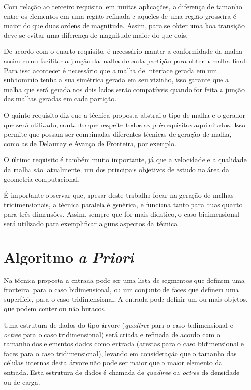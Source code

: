 Com relação ao terceiro requisito, em muitas aplicações, a diferença de tamanho entre os elementos em uma região refinada e aqueles de uma região grosseira é maior do que duas ordens de magnitude. Assim, para se obter uma boa transição deve-se evitar uma diferença de magnitude maior do que dois.

De acordo com o quarto requisito, é necessário manter a conformidade da malha assim como facilitar a junção da malha de cada partição para obter a malha final. Para isso acontecer é necessário que a malha de interface gerada em um subdomínio tenha a sua simétrica gerada em seu vizinho, isso garante que a malha que será gerada nos dois lados serão compatíveis quando for feita a junção das malhas geradas em cada partição.

O quinto requisito diz que a técnica proposta abstrai o tipo de malha e o gerador que será utilizado, contanto que respeite todos os pré-requisitos aqui citados. Isso permite que possam ser combinadas diferentes técnicas de geração de malha, como as de Delaunay e Avanço de Fronteira, por exemplo.

O último requisito é também muito importante, já que a velocidade e a qualidade da malha são, atualmente, um dos principais objetivos de estudo na área da geometria computacional.

É importante observar que, apesar deste trabalho focar na geração de malhas tridimensionais, a técnica paralela é genérica, e funciona tanto para duas quanto para três dimensões. Assim, sempre que for mais didático, o caso bidimensional será utilizado para exemplificar alguns aspectos da técnica.



\section{Algoritmo \textit{a Priori}}

Na técnica proposta a entrada pode ser uma lista de segmentos que definem uma fronteira, para o caso bidimensional, ou um conjunto de faces que definem uma superfície, para o caso tridimensional. A entrada pode definir um ou mais objetos, que podem conter ou não buracos. 

Uma estrutura de dados do tipo árvore (\textit{quadtree} para o caso bidimensional e \textit{octree} para o caso tridimensional) será criada e refinada de acordo com o tamanho dos elementos dados como entrada (arestas para o caso bidimensional e faces para o caso tridimensional), levando em consideração que o tamanho das células internas desta árvore não pode ser maior que o maior elemento da entrada. Esta estrutura de dados é chamada de \textit{quadtree} ou \textit{octree} de densidade ou de carga.

